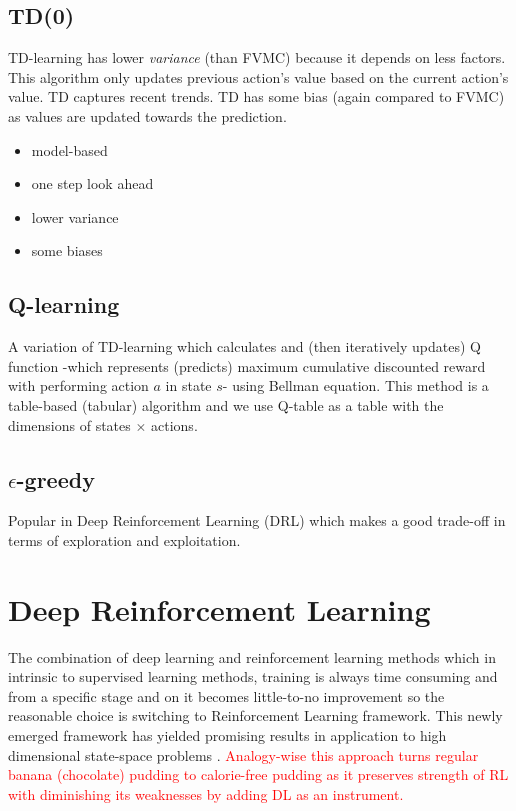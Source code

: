 \documentclass[a4paper,12pt]{article}
\begin{document}
\subsection{TD(0)}
TD-learning has lower \textit{variance} (than FVMC) because it depends on less factors. This algorithm only updates previous action's value based on the current action's value. TD captures recent trends. TD has some bias (again compared to FVMC) as values are updated towards the prediction.
\begin{itemize}
    \item model-based
    \item one step look ahead
    \item lower variance
    \item some biases
\end{itemize}

\subsection{Q-learning}
A variation of TD-learning which calculates and (then iteratively updates) Q function -which represents (predicts) maximum cumulative discounted reward with performing action $a$ in state $s$- using Bellman equation. This method is a table-based (tabular) algorithm and we use Q-table as a table with the dimensions of states $\times$ actions.

\subsection{$\epsilon$-greedy}
Popular in Deep Reinforcement Learning (DRL) which makes a good trade-off in terms of exploration and exploitation.

\section{Deep Reinforcement Learning}
The combination of deep learning and reinforcement learning methods which in intrinsic to supervised learning methods, training is always time consuming and from a specific stage and on it becomes little-to-no improvement so the reasonable choice is switching to Reinforcement Learning framework. This newly emerged framework has yielded promising results in application to high dimensional state-space problems \cite{Francois-Lavet2018}. \textcolor{red}{ Analogy-wise this approach turns regular banana (chocolate) pudding to calorie-free pudding as it preserves strength of RL with diminishing its weaknesses by adding DL as an instrument.}
\end{document}

